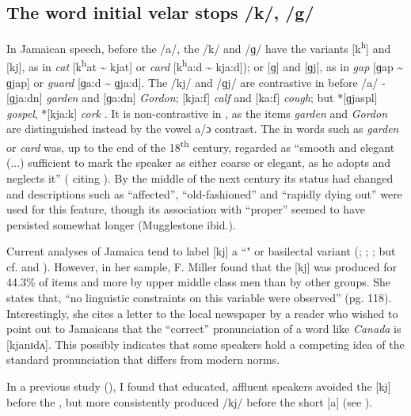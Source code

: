 \subsection{{The} {word} {initial} {velar} {stops} {/k/,} {/g/}}%
In Jamaican speech, before the  /a/, the /k/ and /ɡ/ have the variants [k\textsuperscript{h}] and [kj], as in \textit{cat} [k\textsuperscript{h}at {\textasciitilde} kjat] or \textit{card} [k\textsuperscript{h}a:d {\textasciitilde} kja:d]); or [ɡ] and [ɡj], as in \textit{gap} [ɡap {\textasciitilde} ɡjap] or \textit{guard} [ɡa:d {\textasciitilde} ɡja:d].  The /kj/ and /ɡj/ are contrastive in  before /a/ - [ɡja:dn] \textit{garden} and [ɡa:dn] \textit{Gordon}; [kja:f] \textit{calf} and [ka:f] \textit{cough}; but *[ɡjaspl] \textit{gospel}, *[kja:k] \textit{cork} .  It is non-contrastive in , as the items \textit{garden} and \textit{Gordon} are distinguished instead by the vowel a/ɔ contrast.  The  in words such as \textit{garden} or \textit{card} was, up to the end of the 18\textsuperscript{th} century, regarded as “smooth and elegant (...) sufficient to mark the speaker as either coarse or elegant, as he adopts and neglects it” (\citealt[233]{Mugglestone1995} citing \citealt{Walker1781}).  By the middle of the next century its status had changed \citep[lviii]{Cassidy1967} and descriptions such as “affected”, “old-fashioned” and “rapidly dying out” were used for this feature, though its association with “proper”  seemed to have persisted somewhat longer (Mugglestone ibid.). 

Current analyses of Jamaica tend to label [kj] a ``" or basilectal variant (\citealt[33]{Akers1981}; \citealt[89]{Miller1987}; \citealt[569]{Wells1982c}; but cf. \citealt[96]{Patrick1999} and \citeyear[11]{Patrick2000}).  However, in her  sample, F. Miller found that the [kj] was produced for 44.3\% of items and more by upper middle class men than by other groups.  She states that, “no linguistic constraints on this variable were observed” (pg. 118).  Interestingly, she cites a letter to the local newspaper by a reader who wished to point out to Jamaicans that the “correct” pronunciation of a word like \textit{Canada} is [kjanɪdʌ].  This possibly indicates that some speakers hold a competing idea of the standard pronunciation that differs from modern  norms.  

In a previous study (\citealt[69]{Irvine1994}), I found that educated, affluent speakers avoided the [kj] before the , but more consistently produced /kj/ before the short [a] (see ).

